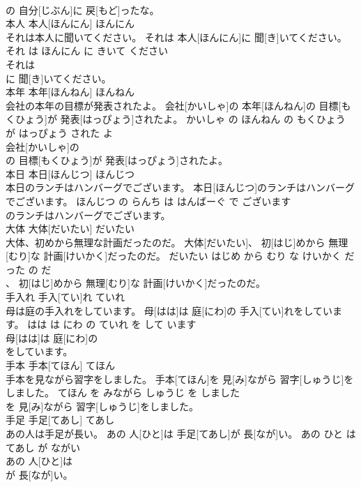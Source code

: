\documentclass[8pt]{extreport}
\begin{document}
\begin{CJK}{UTF8}{min}
\\	の 自分[じぶん]に 戻[もど]ったな。			
\\	本人	本人[ほんにん]	ほんにん	
\\	それは本人に聞いてください。	それは 本人[ほんにん]に 聞[き]いてください。	それ は ほんにん に きいて ください	
\\	それは
\\	に 聞[き]いてください。			
\\	本年	本年[ほんねん]	ほんねん	
\\	会社の本年の目標が発表されたよ。	会社[かいしゃ]の 本年[ほんねん]の 目標[もくひょう]が 発表[はっぴょう]されたよ。	かいしゃ の ほんねん の もくひょう が はっぴょう された よ	
\\	会社[かいしゃ]の
\\	の 目標[もくひょう]が 発表[はっぴょう]されたよ。			
\\	本日	本日[ほんじつ]	ほんじつ	
\\	本日のランチはハンバーグでございます。	本日[ほんじつ]のランチはハンバーグでございます。	ほんじつ の らんち は はんばーぐ で ございます	
\\	のランチはハンバーグでございます。			
\\	大体	大体[だいたい]	だいたい	
\\	大体、初めから無理な計画だったのだ。	大体[だいたい]、 初[はじ]めから 無理[むり]な 計画[けいかく]だったのだ。	だいたい はじめ から むり な けいかく だった の だ	
\\	、 初[はじ]めから 無理[むり]な 計画[けいかく]だったのだ。			
\\	手入れ	手入[てい]れ	ていれ	
\\	母は庭の手入れをしています。	母[はは]は 庭[にわ]の 手入[てい]れをしています。	はは は にわ の ていれ を して います	
\\	母[はは]は 庭[にわ]の
\\	をしています。			
\\	手本	手本[てほん]	てほん	
\\	手本を見ながら習字をしました。	手本[てほん]を 見[み]ながら 習字[しゅうじ]をしました。	てほん を みながら しゅうじ を しました	
\\	を 見[み]ながら 習字[しゅうじ]をしました。			
\\	手足	手足[てあし]	てあし	
\\	あの人は手足が長い。	あの 人[ひと]は 手足[てあし]が 長[なが]い。	あの ひと は てあし が ながい	
\\	あの 人[ひと]は
\\	が 長[なが]い。			

\end{CJK}
\end{document}
